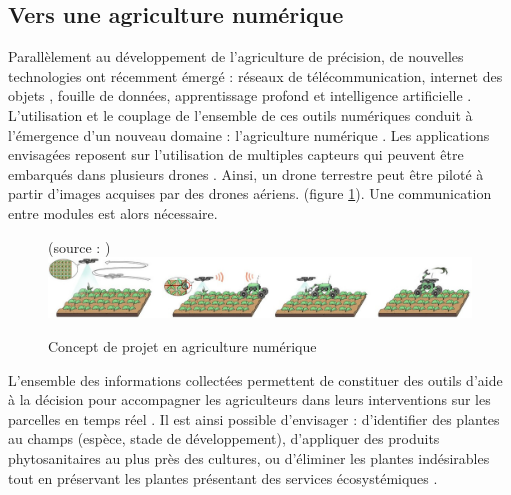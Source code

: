 \documentclass[../thesis.tex]{subfiles}
\begin{document}
    \newpage
    \subsection{Vers une agriculture numérique}
    \label{sec:numerical-agriculture}
    
    Parallèlement au développement de l'agriculture de précision, de nouvelles technologies ont récemment émergé : réseaux de télécommunication, internet des objets \cite{TANG2021105895}, fouille de données, apprentissage profond et intelligence artificielle . L'utilisation et le couplage de l'ensemble de ces outils numériques conduit à l'émergence d'un nouveau domaine : l'agriculture numérique \cite{Birner2021}.
    Les applications envisagées reposent sur l'utilisation de multiples capteurs qui peuvent être embarqués dans plusieurs drones \cite{Pretto2019}. Ainsi, un drone terrestre peut être piloté à partir d'images acquises par des drones aériens. (figure \ref{fig:02-agri-precision}). Une communication entre modules est alors nécessaire.
    
    
    \vfill
    \begin{figure}[H]
        \centering
        {\scriptsize (source : \cite{Pretto2019})} \\
        \includegraphics[width=\linewidth]{img/intro/agri-precision-flat}
        \caption{Concept de projet en agriculture numérique}
        \label{fig:02-agri-precision}
    \end{figure}
    \vfill
    
    L'ensemble des informations collectées permettent de constituer des outils d'aide à la décision pour accompagner les agriculteurs dans leurs interventions sur les parcelles en temps réel \cite{bellon2019avant, saddik2022computer}. Il est ainsi possible d'envisager : %
    d'identifier des plantes au champs (espèce, stade de développement), d'appliquer des produits phytosanitaires au plus près des cultures, ou d'éliminer les plantes indésirables tout en préservant les plantes présentant des services écosystémiques \cite{Green2021}.
    
\end{document}
